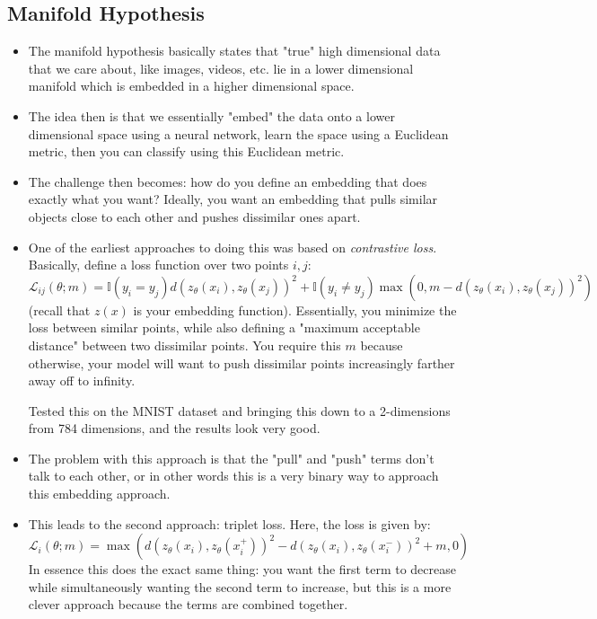 \subsection{Manifold Hypothesis}
\begin{itemize}
	\item The manifold hypothesis basically states that "true" high dimensional data that we care about, like
		images, videos, etc. lie in a lower dimensional manifold which is embedded in a higher dimensional
		space.   
	\item The idea then is that we essentially "embed" the data onto a lower dimensional space using a neural
		network, learn the
		space using a Euclidean metric, then you can classify using this Euclidean metric. 

	\item The challenge then becomes: how do you define an embedding that does exactly what you want?
		Ideally, you want an embedding that pulls similar objects close to each other and pushes dissimilar
		ones apart.
	\item One of the earliest approaches to doing this was based on \textit{contrastive loss}. Basically,
		define a loss function over two points \( i, j \):
		\[
			\mathcal{L}_{ij}(\theta; m) = \mathbb I (y_i = y_j)d(z_{\theta}(x_i), z_{\theta}(x_j))^2
			+ \mathbb I (y_i \neq y_j) \max(0, m - d(z_{\theta}(x_i), z_{\theta}(x_j))^2)
		\]
		(recall that \( z(x) \) is your embedding function). 
		Essentially, you minimize the loss between similar points, while also defining a "maximum acceptable
		distance" between two dissimilar points. You require this \( m \) because otherwise, your model will
		want to push dissimilar points increasingly farther away off to infinity.  

		Tested this on the MNIST dataset and bringing this down to a 2-dimensions from 784 dimensions, and
		the results look very good.    
	\item The problem with this approach is that the "pull" and "push" terms don't talk to each other, or in
		other words this is a very binary way to approach this embedding approach. 
	\item This leads to the second approach: triplet loss. Here, the loss is given by:
		\[
			\mathcal{L}_i(\theta; m) = \max(d(z_\theta(x_i), z_{\theta}(x_i^{+}))^2 - d(z_{\theta}(x_i),
			z_{\theta}(x_i^{-}))^2 + m, 0)
		\]
		In essence this does the exact same thing: you want the first term to decrease while simultaneously
		wanting the second term to increase, but this is a more clever approach because the terms are
		combined together. 
		

\end{itemize}

